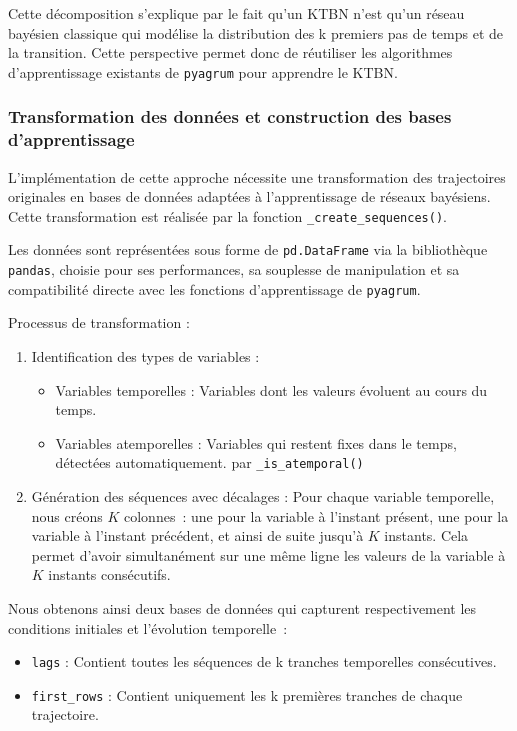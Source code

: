 \documentclass{article}
\begin{document}
Cette décomposition s'explique par le fait qu'un KTBN n'est qu'un réseau bayésien classique qui modélise la
distribution des k premiers pas de temps et de la transition. Cette perspective permet donc de réutiliser
les algorithmes d'apprentissage existants de \texttt{pyagrum} pour apprendre le KTBN.

\subsubsection{Transformation des données et construction des bases d'apprentissage}

L'implémentation de cette approche nécessite une transformation des trajectoires originales en bases de données
adaptées à l'apprentissage de réseaux bayésiens. Cette transformation est réalisée par la fonction
\texttt{\_create\_sequences()}.

Les données sont représentées sous forme de \texttt{pd.DataFrame} via la bibliothèque \texttt{pandas}, choisie
pour ses performances, sa souplesse de manipulation et sa compatibilité directe avec les fonctions d'apprentissage
de \texttt{pyagrum}.

Processus de transformation :

\begin{enumerate}
    \item Identification des types de variables :
          \begin{itemize}
              \item Variables temporelles : Variables dont les valeurs évoluent au cours du temps.
              \item Variables atemporelles : Variables qui restent fixes dans le temps, détectées automatiquement.
                    par \texttt{\_is\_atemporal()}
          \end{itemize}
    \item Génération des séquences avec décalages :
          Pour chaque variable temporelle, nous créons $K$ colonnes~: une pour la variable à l'instant présent,
          une pour la variable à l'instant précédent, et ainsi de suite jusqu'à $K$ instants. Cela permet d'avoir
          simultanément sur une même ligne les valeurs de la variable à $K$ instants consécutifs.
\end{enumerate}

Nous obtenons ainsi deux bases de données qui capturent respectivement les conditions initiales et l'évolution temporelle :

\begin{itemize}
    \item \texttt{lags} : Contient toutes les séquences de k tranches temporelles consécutives.
    \item \texttt{first\_rows} : Contient uniquement les k premières tranches de chaque trajectoire.
\end{itemize}
\end{document}
